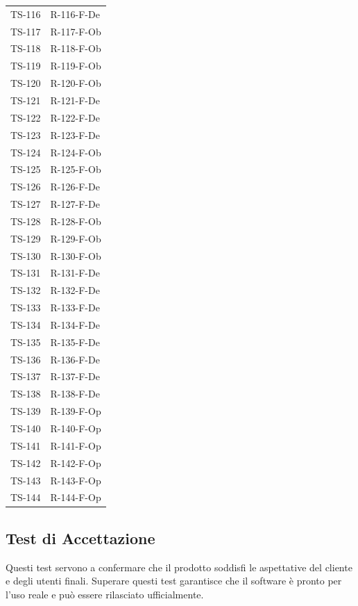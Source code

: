 \documentclass[a4paper, 11pt]{article}
\begin{document}
\begin{longtable}{>{\centering\arraybackslash}m{2.5cm} >{\centering\arraybackslash}m{3.5cm}}
TS-116 & R-116-F-De \\
TS-117 & R-117-F-Ob \\
TS-118 & R-118-F-Ob \\
TS-119 & R-119-F-Ob \\
TS-120 & R-120-F-Ob \\
TS-121 & R-121-F-De \\
TS-122 & R-122-F-De \\
TS-123 & R-123-F-De \\
TS-124 & R-124-F-Ob \\
TS-125 & R-125-F-Ob \\
TS-126 & R-126-F-De \\
TS-127 & R-127-F-De \\
TS-128 & R-128-F-Ob \\
TS-129 & R-129-F-Ob \\
TS-130 & R-130-F-Ob \\
TS-131 & R-131-F-De \\
TS-132 & R-132-F-De \\
TS-133 & R-133-F-De \\
TS-134 & R-134-F-De \\
TS-135 & R-135-F-De \\
TS-136 & R-136-F-De \\
TS-137 & R-137-F-De \\
TS-138 & R-138-F-De \\
TS-139 & R-139-F-Op \\
TS-140 & R-140-F-Op \\
TS-141 & R-141-F-Op \\
TS-142 & R-142-F-Op \\
TS-143 & R-143-F-Op \\
TS-144 & R-144-F-Op \\

\end{longtable}

\subsection{Test di Accettazione}
Questi test servono a confermare che il prodotto soddisfi le aspettative del cliente e degli utenti finali. Superare questi test garantisce che il software è pronto per l'uso reale e può essere rilasciato ufficialmente.
\end{document}
